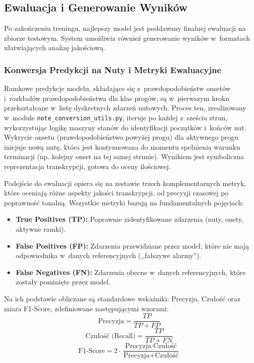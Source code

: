 \subsection{Ewaluacja i Generowanie Wyników}
\label{ssec:ewaluacja_generowanie_wynikow_rozdzial}

Po zakończeniu treningu, najlepszy model jest poddawany finalnej ewaluacji na zbiorze testowym. System umożliwia również generowanie wyników w~formatach ułatwiających analizę jakościową.

\subsubsection{Konwersja Predykcji na Nuty i Metryki Ewaluacyjne}
\label{sssec:konwersja_metryki_ewaluacyjne}

Ramkowe predykcje modelu, składające się z~prawdopodobieństw onsetów i~rozkładów prawdopodobieństwa dla klas progów, są w~pierwszym kroku przekształcane w~listę dyskretnych zdarzeń nutowych. Proces ten, zrealizowany w~module \texttt{note\_conversion\_utils.py}, iteruje po każdej z~sześciu strun, wykorzystując logikę maszyny stanów do identyfikacji początków i~końców nut. Wykrycie onsetu (prawdopodobieństwo powyżej progu) dla aktywnego progu inicjuje nową nutę, która jest kontynuowana do momentu spełnienia warunku terminacji (np. kolejny onset na tej samej strunie). Wynikiem jest symboliczna reprezentacja transkrypcji, gotowa do oceny ilościowej.

Podejście do ewaluacji opiera się na zestawie trzech komplementarnych metryk, które oceniają różne aspekty jakości transkrypcji, od precyzji czasowej po poprawność tonalną. Wszystkie metryki bazują na fundamentalnych pojęciach:
\begin{itemize}
    \item \textbf{True Positives (TP):} Poprawnie zidentyfikowane zdarzenia (nuty, onety, aktywne ramki).
    \item \textbf{False Positives (FP):} Zdarzenia przewidziane przez model, które nie mają odpowiednika w~danych referencyjnych (,,fałszywe alarmy'').
    \item \textbf{False Negatives (FN):} Zdarzenia obecne w~danych referencyjnych, które zostały pominięte przez model.
\end{itemize}
Na ich podstawie obliczane są standardowe wskaźniki: Precyzja, Czułość oraz miara F1-Score, zdefiniowane następującymi wzorami:
\begin{equation}
    \text{Precyzja} = \frac{TP}{TP + FP}
    \label{eq:precision}
\end{equation}
\begin{equation}
    \text{Czułość (Recall)} = \frac{TP}{TP + FN}
    \label{eq:recall}
\end{equation}
\begin{equation}
    \text{F1-Score} = 2 \cdot \frac{\text{Precyzja} \cdot \text{Czułość}}{\text{Precyzja} + \text{Czułość}}
    \label{eq:f1_score}
\end{equation}

